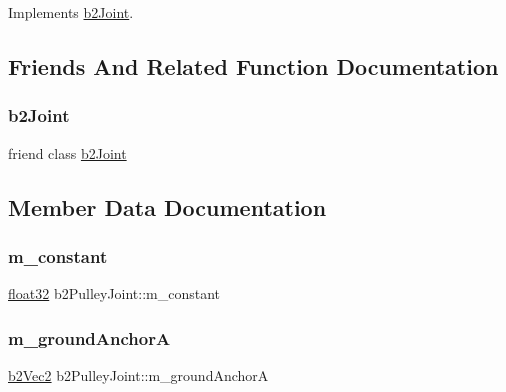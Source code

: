 Implements \mbox{\hyperlink{classb2_joint_ad302c8d02efcfe934158de0dc429348d}{b2\+Joint}}.



\subsection{Friends And Related Function Documentation}
\mbox{\label{classb2_pulley_joint_a54ade8ed3d794298108d7f4c4e4793fa}} 
\subsubsection{\texorpdfstring{b2Joint}{b2Joint}}
{\footnotesize\ttfamily friend class \mbox{\hyperlink{classb2_joint}{b2\+Joint}}\hspace{0.3cm}{\ttfamily [friend]}}



\subsection{Member Data Documentation}
\mbox{\label{classb2_pulley_joint_a0e73d1d31126331267a1661beb146bc7}} 
\subsubsection{\texorpdfstring{m\_constant}{m\_constant}}
{\footnotesize\ttfamily \mbox{\hyperlink{b2_settings_8h_aacdc525d6f7bddb3ae95d5c311bd06a1}{float32}} b2\+Pulley\+Joint\+::m\+\_\+constant\hspace{0.3cm}{\ttfamily [protected]}}

\mbox{\label{classb2_pulley_joint_a13456d1c62a4e96e8247988152be4166}} 
\subsubsection{\texorpdfstring{m\_groundAnchorA}{m\_groundAnchorA}}
{\footnotesize\ttfamily \mbox{\hyperlink{structb2_vec2}{b2\+Vec2}} b2\+Pulley\+Joint\+::m\+\_\+ground\+AnchorA\hspace{0.3cm}{\ttfamily [protected]}}

